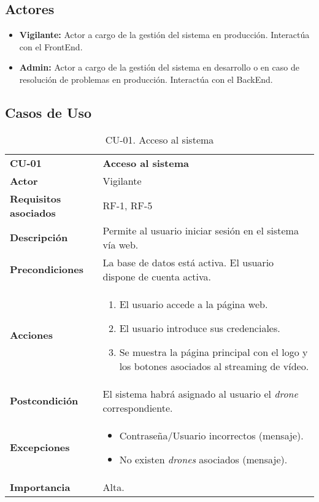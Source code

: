 \subsection{Actores}

\begin{itemize}
\item \textbf{Vigilante:} Actor a cargo de la gestión del sistema en producción. Interactúa con el FrontEnd.
\item \textbf{Admin:} Actor a cargo de la gestión del sistema en desarrollo o en caso de resolución de problemas en producción. Interactúa con el BackEnd.
\end{itemize}

\subsection{Casos de Uso}

\begin{table}[H]
	\begin{center}
		\begin{tabular}{m{3cm}  m{10cm}}\hline
			\toprule
			\textbf{CU-01} & \textbf{Acceso al sistema}\\
			\otoprule
			\textbf{Actor} & Vigilante\\
			\textbf{Requisitos asociados} & RF-1, RF-5\\
			\textbf{Descripción} & Permite al usuario iniciar sesión en el sistema vía web.\\
			\textbf{Precondiciones} & La base de datos está activa. El usuario dispone de cuenta activa.\\
			\textbf{Acciones} & \begin{enumerate}
											\item El usuario accede a la página web.
											\item El usuario introduce sus credenciales.
											\item Se muestra la página principal con el logo y los botones asociados al streaming de vídeo.
											\end{enumerate}\\
			
			\textbf{Postcondición} & El sistema habrá asignado al usuario el \emph{drone} correspondiente. \\
			\textbf{Excepciones} & \begin{itemize}
												\item Contraseña/Usuario incorrectos (mensaje).
												\item No existen \emph{drones} asociados (mensaje).
												\end{itemize}\\
			\textbf{Importancia} & Alta.\\
			\hline
			\bottomrule
		\end{tabular}
		\caption{CU-01. Acceso al sistema}
		\label{tb:CU01}
	\end{center}
\end{table}



